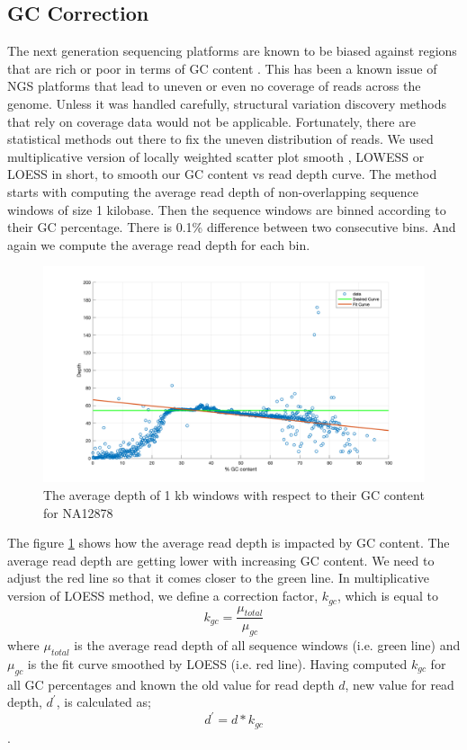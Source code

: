 \subsection{GC Correction}
The next generation sequencing platforms are known to be biased against regions that are rich or poor in terms of GC content \cite{smith2008rapid}. This has been a known issue of NGS platforms that lead to uneven or even no coverage of reads across the genome. Unless it was handled carefully, structural variation discovery methods that rely on coverage data would not be applicable. Fortunately, there are statistical methods out there to fix the uneven distribution of reads. We used multiplicative version of locally weighted scatter plot smooth \cite{cleveland1991computational}, LOWESS or LOESS in short, to smooth our GC content vs read depth curve. The method starts with computing the average read depth of non-overlapping sequence windows of size 1 kilobase. Then the sequence windows are binned according to their GC percentage. There is 0.1\% difference between two consecutive bins. And again we compute the average read depth for each bin.
\begin{figure}[ht]
    \centering
    \includegraphics[scale=0.25]{images/gcCorrection.png}
    \caption{The average depth of 1 kb windows with respect to their GC content for NA12878}
    \label{gcCorrection}
\end{figure}
The figure \ref{gcCorrection} shows how the average read depth is impacted by GC content. The average read depth are getting lower with increasing GC content. We need to adjust the red line so that it comes closer to the green line. In multiplicative version of LOESS method, we define a correction factor, $k_{gc}$, which is equal to $$k_{gc} = \frac{\mu_{total}}{\mu_{gc}}$$ where $\mu_{total}$ is the average read depth of all sequence windows (i.e. green line) and $\mu_{gc}$ is the fit curve smoothed by LOESS (i.e. red line). Having computed $k_{gc}$ for all GC percentages and known the old value for read depth $d$,  new value for read depth, $d^\prime$, is calculated as; $$d^\prime = d*k_{gc}$$.


